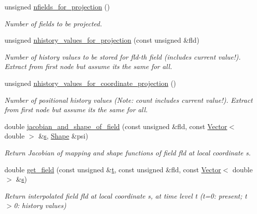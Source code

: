 \begin{DoxyCompactItemize}
unsigned \hyperlink{classoomph_1_1GenericLagrangeInterpolatedProjectableElement_abc3c4f65ddb05984629ad9e35daa209a}{nfields\+\_\+for\+\_\+projection} ()
\begin{DoxyCompactList}\small\item\em Number of fields to be projected. \end{DoxyCompactList}\item 
unsigned \hyperlink{classoomph_1_1GenericLagrangeInterpolatedProjectableElement_a9343241dc18e1331a5b220fd3fbe07a7}{nhistory\+\_\+values\+\_\+for\+\_\+projection} (const unsigned \&fld)
\begin{DoxyCompactList}\small\item\em Number of history values to be stored for fld-\/th field (includes current value!). Extract from first node but assume it\textquotesingle{}s the same for all. \end{DoxyCompactList}\item 
unsigned \hyperlink{classoomph_1_1GenericLagrangeInterpolatedProjectableElement_a43bb151ce94f5f171b5f0577e1f46909}{nhistory\+\_\+values\+\_\+for\+\_\+coordinate\+\_\+projection} ()
\begin{DoxyCompactList}\small\item\em Number of positional history values (Note\+: count includes current value!). Extract from first node but assume it\textquotesingle{}s the same for all. \end{DoxyCompactList}\item 
double \hyperlink{classoomph_1_1GenericLagrangeInterpolatedProjectableElement_ac9e67d23b865eb118acbca2eea74c8a3}{jacobian\+\_\+and\+\_\+shape\+\_\+of\+\_\+field} (const unsigned \&fld, const \hyperlink{classoomph_1_1Vector}{Vector}$<$ double $>$ \&\hyperlink{cfortran_8h_ab7123126e4885ef647dd9c6e3807a21c}{s}, \hyperlink{classoomph_1_1Shape}{Shape} \&psi)
\begin{DoxyCompactList}\small\item\em Return Jacobian of mapping and shape functions of field fld at local coordinate s. \end{DoxyCompactList}\item 
double \hyperlink{classoomph_1_1GenericLagrangeInterpolatedProjectableElement_a788234ec49e0702b4af030d03a454adc}{get\+\_\+field} (const unsigned \&\hyperlink{cfortran_8h_af6f0bd3dc13317f895c91323c25c2b8f}{t}, const unsigned \&fld, const \hyperlink{classoomph_1_1Vector}{Vector}$<$ double $>$ \&\hyperlink{cfortran_8h_ab7123126e4885ef647dd9c6e3807a21c}{s})
\begin{DoxyCompactList}\small\item\em Return interpolated field fld at local coordinate s, at time level t (t=0\+: present; t$>$0\+: history values) \end{DoxyCompactList}\item 

\end{DoxyCompactItemize}
